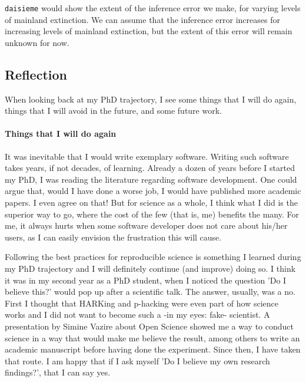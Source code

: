 \verb;daisieme; would show the extent of the inference error we make,
for varying levels of mainland extinction. We can assume that the inference 
error increases for increasing levels of mainland extinction, but the extent
of this error will remain unknown for now.


\subsection{Reflection}

When looking back at my PhD trajectory, I see some things that I will
do again, things that I will avoid in the future, and some future work.

\paragraph{Things that I will do again} 

It was inevitable that I would write exemplary software. Writing such
software takes years, if not decades, of learning. 
Already a dozen of years before I started my PhD, I was reading the literature
regarding software development. One could argue that, would I have done 
a worse job, I would have published more academic papers. I even agree
on that! But for science as a whole, I think what I did is the superior
way to go, where the cost of the few (that is, me) benefits the many. 
For me, it always hurts when some software developer does not
care about his/her users, as I can easily envision the frustration 
this will cause.

Following the best practices for reproducible science is something
I learned during my PhD trajectory and I will definitely continue (and improve)
doing so. I think it was in my second year as a PhD student, 
when I noticed the question 'Do I believe this?' would pop up
after a scientific talk. The answer, usually, was a no. First I thought
that HARKing and p-hacking were even part of how science works
and I did not want to become such a -in my eyes: fake- scientist.
A presentation by Simine Vazire about Open Science showed me a way
to conduct science in a way that would make me believe the result,
among others to write an academic manuscript before having done
the experiment. Since then, I have taken that route. 
I am happy that if I ask myself 'Do I believe my own research findings?', 
that I can say yes.


